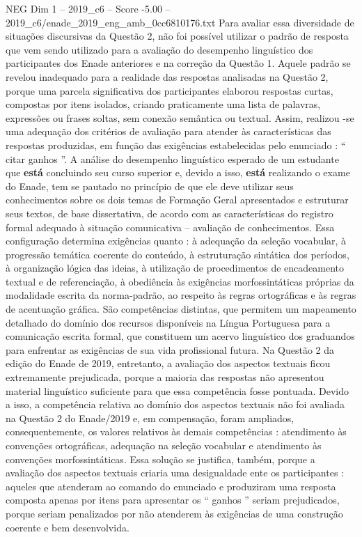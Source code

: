 \begin{textsample}{NEG Dim 1 – 2019\_c6 – Score -5.00 – 2019\_c6/enade\_2019\_eng\_amb\_0cc6810176.txt}
Para avaliar essa diversidade de situações discursivas da Questão 2, não foi possível utilizar o padrão de resposta que vem sendo utilizado para a avaliação do desempenho linguístico dos participantes dos Enade anteriores e na correção da Questão 1.
Aquele padrão se revelou inadequado para a realidade das respostas analisadas na Questão 2, porque uma parcela significativa dos participantes elaborou respostas curtas, compostas por itens isolados, criando praticamente uma lista de palavras, expressões ou frases soltas, sem conexão semântica ou textual.
Assim, realizou -se uma adequação dos critérios de avaliação para atender às características das respostas produzidas, em função das exigências estabelecidas pelo enunciado : “ citar ganhos ”.
A análise do desempenho linguístico esperado de um estudante que \textbf{está} concluindo seu curso superior e, devido a isso, \textbf{está} realizando o exame do Enade, tem se pautado no princípio de que ele deve utilizar seus conhecimentos sobre os dois temas de Formação Geral apresentados e estruturar seus textos, de base dissertativa, de acordo com as características do registro formal adequado à situação comunicativa – avaliação de conhecimentos.
Essa configuração determina exigências quanto : à adequação da seleção vocabular, à progressão temática coerente do conteúdo, à estruturação sintática dos períodos, à organização lógica das ideias, à utilização de procedimentos de encadeamento textual e de referenciação, à obediência às exigências morfossintáticas próprias da modalidade escrita da norma-padrão, ao respeito às regras ortográficas e às regras de acentuação gráfica.
São competências distintas, que permitem um mapeamento detalhado do domínio dos recursos disponíveis na Língua Portuguesa para a comunicação escrita formal, que constituem um acervo linguístico dos graduandos para enfrentar as exigências de sua vida profissional futura.
Na Questão 2 da edição do Enade de 2019, entretanto, a avaliação dos aspectos textuais ficou extremamente prejudicada, porque a maioria das respostas não apresentou material linguístico suficiente para que essa competência fosse pontuada.
Devido a isso, a competência relativa ao domínio dos aspectos textuais não foi avaliada na Questão 2 do Enade/2019 e, em compensação, foram ampliados, consequentemente, os valores relativos às demais competências : atendimento às convenções ortográficas, adequação na seleção vocabular e atendimento às convenções morfossintáticas.
Essa solução se justifica, também, porque a avaliação dos aspectos textuais criaria uma desigualdade ente os participantes : aqueles que atenderam ao comando do enunciado e produziram uma resposta composta apenas por itens para apresentar os “ ganhos ” seriam prejudicados, porque seriam penalizados por não atenderem às exigências de uma construção coerente e bem desenvolvida.

\end{textsample}
